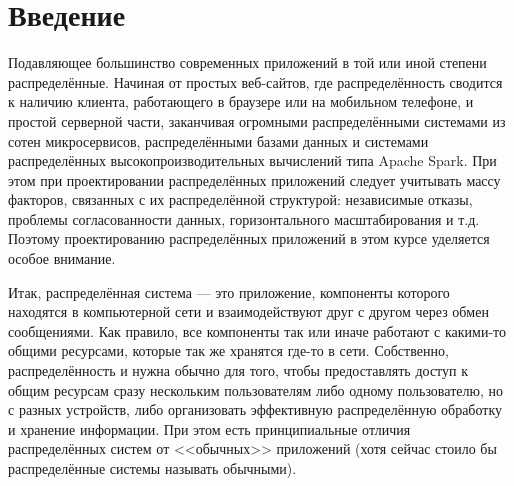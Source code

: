 \documentclass{../../text-style}
\begin{document}
\maketitle
\thispagestyle{empty}

\section{Введение}

Подавляющее большинство современных приложений в той или иной степени распределённые. Начиная от простых веб-сайтов, где распределённость сводится к наличию клиента, работающего в браузере или на мобильном телефоне, и простой серверной части, заканчивая огромными распределёнными системами из сотен микросервисов, распределёнными базами данных и системами распределённых высокопроизводительных вычислений типа Apache Spark. При этом при проектировании распределённых приложений следует учитывать массу факторов, связанных с их распределённой структурой: независимые отказы, проблемы согласованности данных, горизонтального масштабирования и т.д. Поэтому проектированию распределённых приложений в этом курсе уделяется особое внимание.

Итак, распределённая система --- это приложение, компоненты которого находятся в компьютерной сети и взаимодействуют друг с другом через обмен сообщениями. Как правило, все компоненты так или иначе работают с какими-то общими ресурсами, которые так же хранятся где-то в сети. Собственно, распределённость и нужна обычно для того, чтобы предоставлять доступ к общим ресурсам сразу нескольким пользователям либо одному пользователю, но с разных устройств, либо организовать эффективную распределённую обработку и хранение информации. При этом есть принципиальные отличия распределённых систем от <<обычных>> приложений (хотя сейчас стоило бы распределённые системы называть обычными).
\end{document}
